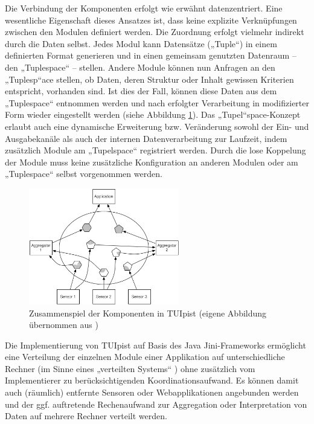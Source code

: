 Die Verbindung der Komponenten erfolgt wie erwähnt datenzentriert. Eine wesentliche Eigenschaft dieses Ansatzes ist, dass keine explizite Verknüpfungen zwischen den Modulen definiert werden. Die Zuordnung erfolgt vielmehr indirekt durch die Daten selbst. Jedes Modul kann Datensätze („Tuple“) in einem definierten Format generieren und in einen gemeinsam genutzten Datenraum -- den „Tuplespace“ -- stellen. Andere Module können nun Anfragen an den „Tuplesp“ace stellen, ob Daten, deren Struktur oder Inhalt gewissen Kriterien entspricht, vorhanden sind. Ist dies der Fall, können diese Daten aus dem „Tuplespace“ entnommen werden und nach erfolgter Verarbeitung in modifizierter Form wieder eingestellt werden (siehe Abbildung \ref{fig:img_ImplementierungInput_TUIpistOperation}). Das „Tupel“space-Konzept erlaubt auch eine dynamische Erweiterung bzw. Veränderung sowohl der Ein- und Ausgabekanäle als auch der internen Datenverarbeitung zur Laufzeit, indem zusätzlich Module am „Tupelspace“ registriert werden. Durch die lose Koppelung der Module muss keine zusätzliche Konfiguration an anderen Modulen oder am „Tuplespace“ selbst vorgenommen werden.

\begin{figure}[htbp]
	\centering
		\includegraphics[height=2in]{img/ImplementierungInput/TUIpistOperation.jpg}
	\caption[Zusammenspiel der Komponenten in TUIpist]{Zusammenspiel der Komponenten in TUIpist (eigene Abbildung übernommen aus \citep{Furtmuller07a})}
	\label{fig:img_ImplementierungInput_TUIpistOperation}
\end{figure}

Die Implementierung von TUIpist auf Basis des Java Jini-Frameworks \citep{Arnold99} ermöglicht eine Verteilung der einzelnen Module einer Applikation auf unterschiedliche Rechner (im Sinne eines „verteilten Systems“ \citep{Stary94}) ohne zusätzlich vom Implementierer zu berücksichtigenden Koordinationsaufwand. Es können damit auch (räumlich) entfernte Sensoren oder Webapplikationen angebunden werden und der ggf. auftretende Rechenaufwand zur Aggregation oder Interpretation von Daten auf mehrere Rechner verteilt werden.

